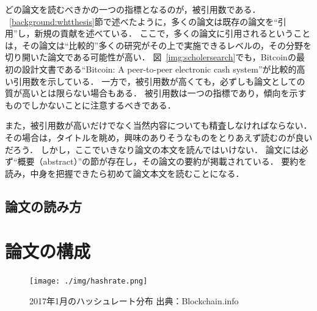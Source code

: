 どの論文を読むべきかの一つの指標となるのが，被引用数である．
~\ref{background:whtthesis}節で述べたように，多くの論文は既存の論文を``引用''し，新規の貢献を述べている．
ここで，多くの論文に引用されるということは，その論文は``比較的''多くの研究がその上で実施できるレベルの，その分野を切り開いた論文である可能性が高い．
図~\ref{img:scholersearch}でも，Bitcoinの最初の設計文書である``Bitcoin: A peer-to-peer electronic cash system''が比較的高い引用数を示している．
一方で，被引用数が高くても，必ずしも論文としての質が高いとは限らない場合もある．
被引用数は一つの指標であり，傾向を示すものでしかないことに注意するべきである．


また，被引用数が高いだけでなく当然内容についても精査しなければならない．
その場合は，タイトルを眺め，興味のありそうなものをとりあえず読むのが良いだろう．
しかし，ここでいきなり論文の本文を読んではいけない．
論文には必ず``概要（abstract）''の節が存在し，その論文の要約が掲載されている．
要約を読み，中身を把握できたら初めて論文本文を読むことになる．

\subsection{論文の読み方}
\label{background:readpaper}


\section{論文の構成}
\label{background:structure}


\begin{figure}[h]
    \begin{center}
        \texttt{[image: ./img/hashrate.png]}
        \caption{2017年1月のハッシュレート分布 出典：Blockchain.info\cite{bitcoinhashrate}}
        \label{img:hashrate}
    \end{center}
\end{figure}
\fi
